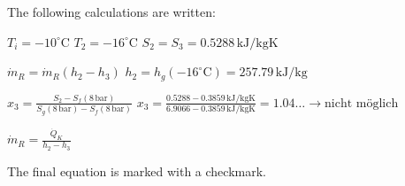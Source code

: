 The following calculations are written:  

\( T_i = -10^\circ \text{C} \)  
\( T_2 = -16^\circ \text{C} \)  
\( S_2 = S_3 = 0.5288 \, \text{kJ/kgK} \)  

\( \dot{m}_R = \dot{m}_R (h_2 - h_3) \)  
\( h_2 = h_g (-16^\circ \text{C}) = 257.79 \, \text{kJ/kg} \)  

\( x_3 = \frac{S_2 - S_f (8 \, \text{bar})}{S_g (8 \, \text{bar}) - S_f (8 \, \text{bar})} \)  
\( x_3 = \frac{0.5288 - 0.3859 \, \text{kJ/kgK}}{6.9066 - 0.3859 \, \text{kJ/kgK}} = 1.04 \ldots \rightarrow \text{nicht möglich} \)  

\( \dot{m}_R = \frac{\dot{Q}_K}{h_2 - h_3} \)  

The final equation is marked with a checkmark.